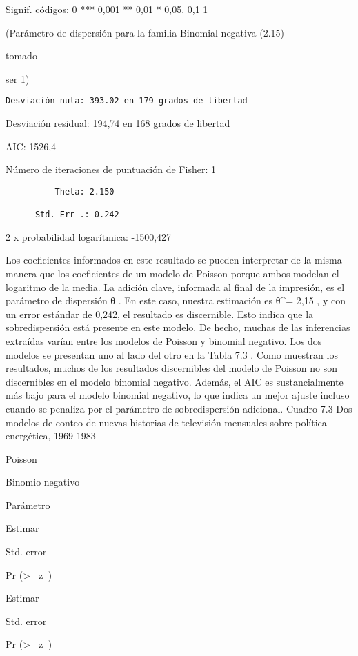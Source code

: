 \documentclass[
]{book}
\begin{document}
Signif. códigos: 0 *** 0,001 ** 0,01 * 0,05. 0,1 1

(Parámetro de dispersión para la familia Binomial negativa (2.15)

tomado

ser 1)

\begin{verbatim}
Desviación nula: 393.02 en 179 grados de libertad
\end{verbatim}

Desviación residual: 194,74 en 168 grados de libertad

AIC: 1526,4

Número de iteraciones de puntuación de Fisher: 1

\begin{verbatim}
          Theta: 2.150

      Std. Err .: 0.242
\end{verbatim}

2 x probabilidad logarítmica: -1500,427

Los coeficientes informados en este resultado se pueden interpretar de la misma manera que los coeficientes de un modelo de Poisson porque ambos modelan el logaritmo de la media. La adición clave, informada al final de la impresión, es el parámetro de dispersión θ . En este caso, nuestra estimación es θ\^{}= 2,15 , y con un error estándar de 0,242, el resultado es discernible. Esto indica que la sobredispersión está presente en este modelo. De hecho, muchas de las inferencias extraídas varían entre los modelos de Poisson y binomial negativo. Los dos modelos se presentan uno al lado del otro en la Tabla 7.3 . Como muestran los resultados, muchos de los resultados discernibles del modelo de Poisson no son discernibles en el modelo binomial negativo. Además, el AIC es sustancialmente más bajo para el modelo binomial negativo, lo que indica un mejor ajuste incluso cuando se penaliza por el parámetro de sobredispersión adicional.
Cuadro 7.3
Dos modelos de conteo de nuevas historias de televisión mensuales sobre política energética, 1969-1983

Poisson

Binomio negativo

Parámetro

Estimar

Std. error

Pr (\textgreater{} \textbar{}  z  \textbar)

Estimar

Std. error

Pr (\textgreater{} \textbar{}  z  \textbar)
\end{document}
